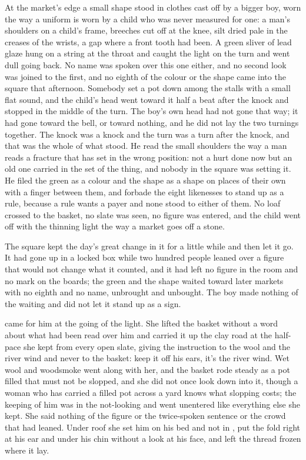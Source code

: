 At the market's edge a small shape stood in clothes cast off by a bigger boy, worn the way a uniform is worn by a child who was never measured for one: a man's shoulders on a child's frame, breeches cut off at the knee, silt dried pale in the creases of the wrists, a gap where a front tooth had been. A green sliver of lead glaze hung on a string at the throat and caught the light on the turn and went dull going back. No name was spoken over this one either, and no second look was joined to the first, and no eighth of the colour or the shape came into the square that afternoon. Somebody set a pot down among the stalls with a small flat sound, and the child's head went toward it half a beat after the knock and stopped in the middle of the turn. The boy's own head had not gone that way; it had gone toward the bell, or toward nothing, and he did not lay the two turnings together. The knock was a knock and the turn was a turn after the knock, and that was the whole of what stood. He read the small shoulders the way a man reads a fracture that has set in the wrong position: not a hurt done now but an old one carried in the set of the thing, and nobody in the square was setting it. He filed the green as a colour and the shape as a shape on places of their own with a finger between them, and forbade the eight likenesses to stand up as a rule, because a rule wants a payer and none stood to either of them. No loaf crossed to the basket, no slate was seen, no figure was entered, and the child went off with the thinning light the way a market goes off a stone.

The square kept the day's great change in it for a little while and then let it go. It had gone up  in a locked box while two hundred people leaned over a figure that would not change what it counted, and it had left no figure in the room and no mark on the boards; the green and the shape waited toward later markets with no eighth and no name, unbrought and unbought. The boy made nothing of the waiting and did not let it stand up as a sign.

\scenebreak

 came for him at the going of the light. She lifted the basket without a word about what had been read over him and carried it up the clay road at the half-pace she kept from every open slate, giving the instruction to the wool and the river wind and never to the basket: keep it off his ears, it's the river wind. Wet wool and woodsmoke went along with her, and the basket rode steady as a pot filled that must not be slopped, and she did not once look down into it, though a woman who has carried a filled pot across a yard knows what slopping costs; the keeping of him was in the not-looking and went unentered like everything else she kept. She said nothing of the figure or the twice-spoken sentence or the crowd that had leaned. Under  roof she set him on his bed and not in , put the fold right at his ear and under his chin without a look at his face, and left the thread frozen where it lay.

